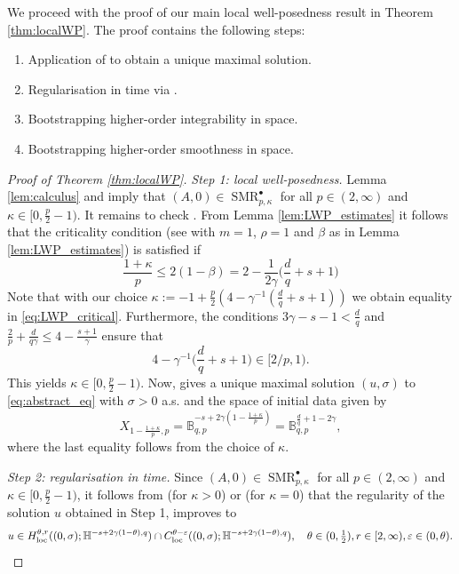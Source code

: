 \documentclass[11pt, a4paper,oneside, reqno]{amsart}
\theoremstyle{remark} %
\theoremstyle{definition} %
\numberwithin{theorem}{section}
\numberwithin{equation}{section}
\newcommand{\Hs}{\mathbb{H}}
\newcommand{\BB}{\mathbb{B}}
\newcommand{\eps}{\varepsilon}
\newcommand{\gam}{\gamma}
\newcommand{\loc}{{\rm loc}}
\DeclareMathOperator{\SMR}{SMR}
\begin{document}
We proceed with the proof of our main local well-posedness result in Theorem \ref{thm:localWP}. The proof contains the following steps:
\begin{enumerate}[1.]
    \item  Application of \cite[Theorem 4.7]{AV25_survey} to obtain a unique maximal solution.
    \item Regularisation in time via \cite[Theorems 5.6 \& 5.7]{AV25_survey}.
    \item Bootstrapping higher-order integrability in space.
    \item Bootstrapping higher-order smoothness in space.
\end{enumerate}
\begin{proof}[Proof of Theorem \ref{thm:localWP}] 
\textit{Step 1: local well-posedness.} Lemma \ref{lem:calculus} and \cite[Theorem 3.14]{AV25_survey} imply that $(A, 0)\in \SMR_{p,\kappa}^{\bullet}$ for all $p\in(2,\infty)$ and $\kappa\in [0, \frac{p}{2}-1)$. It remains to check \cite[Assumption 4.1]{AV25_survey}. From Lemma \ref{lem:LWP_estimates} it follows that the criticality condition (see \cite[Equation (4.3)]{AV25_survey} with $m=1$, $\rho=1$ and $\beta$ as in Lemma \ref{lem:LWP_estimates}) is satisfied if
\begin{equation}\label{eq:LWP_critical}
    \frac{1+\kappa}{p}\leq 2(1-\beta) = 2- \frac{1}{2\gam}\big(\frac{d}{q}+s+1\big)
\end{equation}
Note that with our choice $\kappa:=-1+\frac{p}{2}(4-\gam^{-1}(\frac{d}{q}+s+1))$ we obtain equality in \eqref{eq:LWP_critical}. Furthermore, the conditions $3\gam -s-1 < \frac dq$ and $\frac{2}{p}+\frac{d}{q\gam}\leq 4-\frac{s+1}{\gam}$ ensure that $$4-\gam^{-1}\big(\frac{d}{q}+s+1\big)\in [2/p, 1).$$ This yields $\kappa\in [0, \frac{p}{2}-1)$.
Now, \cite[Theorem 4.7]{AV25_survey} gives a unique maximal solution $(u, \sigma)$ to \eqref{eq:abstract_eq} with $\sigma>0$ a.s. and the space of initial data given by
\begin{equation}\label{eq:tracespace}
    X_{1-\frac{1+\kappa}{p},p}= \BB^{-s+ 2\gam (1-\frac{1+\kappa}{p})}_{q,p} = \BB^{\frac{d}{q}+1-2\gam}_{q,p},
\end{equation}
where the last equality follows from the choice of $\kappa$.

\textit{Step 2: regularisation in time.} Since $(A, 0)\in \SMR_{p,\kappa}^{\bullet}$ for all $p\in(2,\infty)$ and $\kappa\in [0, \frac{p}{2}-1)$, it follows from \cite[Theorem 5.6]{AV25_survey} (for $\kappa>0$) or \cite[Theorem 5.7]{AV25_survey} (for $\kappa=0$) that the regularity of the solution $u$ obtained in Step 1, improves to
\begin{equation*}
    u\in H^{\theta,r}_\loc((0,\sigma); \Hs^{-s+2\gam(1-\theta),q})\cap C^{\theta -\eps}_\loc((0,\sigma); \Hs^{-s+2\gam(1-\theta),q} ),\quad \theta\in (0,\tfrac{1}{2}), r\in[2,\infty), \eps\in(0,\theta).
\end{equation*}



\end{proof}
\end{document}
